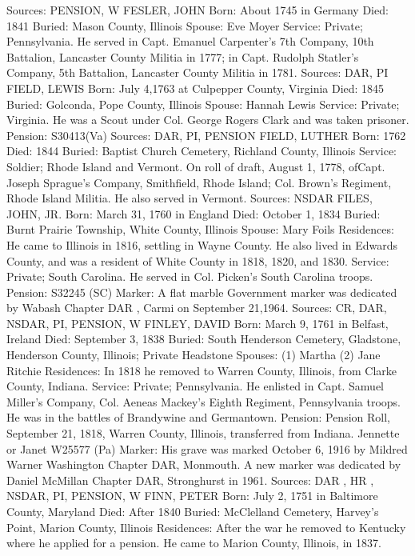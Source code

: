 Sources: PENSION, W 
FESLER, JOHN 
Born: About 1745 in Germany 
Died: 1841 Buried: Mason County, Illinois 
Spouse: Eve Moyer 
Service: Private; Pennsylvania. He served in Capt. Emanuel Carpenter's 7th 
Company, 10th Battalion, Lancaster County Militia in 1777; in Capt. Rudolph Statler's Company, 5th Battalion, Lancaster County Militia in 1781. Sources: DAR, PI 
FIELD, LEWIS 
Born: July 4,1763 at Culpepper County, Virginia 
Died: 1845 Buried: Golconda, Pope County, Illinois 
Spouse: Hannah Lewis 
Service: Private; Virginia. He was a Scout under Col. George Rogers Clark and 
was taken prisoner. 
Pension: S30413(Va) 
Sources: DAR, PI, PENSION 
FIELD, LUTHER 
Born: 1762 
Died: 1844 
Buried: Baptist Church Cemetery, Richland County, Illinois 
Service: Soldier; Rhode Island and Vermont. On roll of draft, August 1, 1778, ofCapt. Joseph Sprague's Company, Smithfield, Rhode Island; Col. Brown's Regiment, Rhode Island Militia. He also served in Vermont. 
Sources: NSDAR 
FILES, JOHN, JR. 
Born: March 31, 1760 in England 
Died: October 1, 1834 
Buried: Burnt Prairie Township, White County, Illinois 
Spouse: Mary Foils
Residences: He came to Illinois in 1816, settling in Wayne County. He also lived in Edwards County, and was a resident of White County in 1818, 1820, and 1830.
Service: Private; South Carolina. He served in Col. Picken's South Carolina troops. 
Pension: S32245 (SC) 
Marker: A flat marble Government marker was dedicated by Wabash Chapter DAR , Carmi on September 21,1964. 
Sources: CR, DAR, NSDAR, PI, PENSION, W 
FINLEY, DAVID 
Born: March 9, 1761 in Belfast, Ireland 
Died: September 3, 1838 
Buried: South Henderson Cemetery, Gladstone, Henderson County, Illinois; Private Headstone 
Spouses: (1) Martha
    (2) Jane Ritchie 
Residences: In 1818 he removed to Warren County, Illinois, from Clarke County, Indiana. 
Service: Private; Pennsylvania. He enlisted in Capt. Samuel Miller's Company, Col. Aeneas Mackey's Eighth Regiment, Pennsylvania troops. He was in the battles of Brandywine and Germantown. 
Pension: Pension Roll, September 21, 1818, Warren County, Illinois, transferred from Indiana. Jennette or Janet W25577 (Pa) 
Marker: His grave was marked October 6, 1916 by Mildred Warner Washington 
Chapter DAR, Monmouth. A new marker was dedicated by Daniel McMillan Chapter DAR, Stronghurst in 1961. 
Sources: DAR , HR , NSDAR, PI, PENSION, W 
FINN, PETER 
Born: July 2, 1751 in Baltimore County, Maryland 
Died: After 1840 
Buried: McClelland Cemetery, Harvey's Point, Marion County, Illinois 
Residences: After the war he removed to Kentucky where he applied for a pen­sion. He came to Marion County, Illinois, in 1837.
